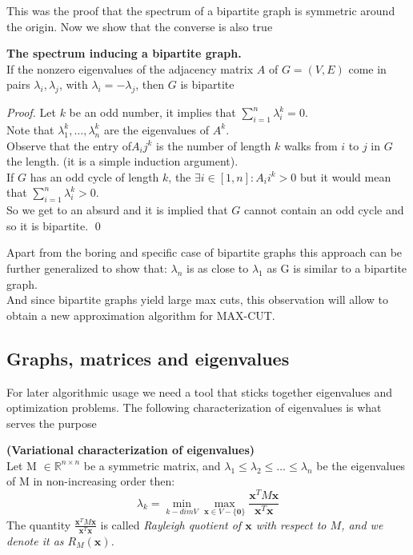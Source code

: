 This was the proof that the spectrum of a bipartite graph is symmetric around the origin. Now we show that the converse is also true
\begin{proposition}{\textbf{The spectrum inducing a bipartite graph.}} \\
If the nonzero eigenvalues of the adjacency matrix $ A $ of $ G=(V,E) $ come in pairs $ \lambda_i, \lambda_j $, with $ \lambda_i = -\lambda_j $, then $ G $ is bipartite
\begin{proof}
Let $ k $ be an odd number, it implies that $ \sum_{i=1}^{n} \lambda_{i}^{k} = 0 $. \\
Note that $ \lambda_1^k, \dots, \lambda_n^k $ are the eigenvalues of $ A^k $. \\
Observe that the entry of$ A_ij^k $ is the number of length $ k $ walks from $ i $ to $ j $ in $ G $ the length. (it is a simple induction argument).\\
If $ G $ has an odd cycle of length $ k $, the $ \exists i \in [1,n] : A_ii^k > 0 $ but it would mean that $ \sum_{i=1}^{n} \lambda_{i}^{k} > 0 $.\\
So we get to an absurd and it is implied that $ G $ cannot contain an odd cycle and so it is bipartite.
\qed
\end{proof}
\end{proposition}	

Apart from the boring and specific case of bipartite graphs this approach can be further generalized to show that:
$ \lambda_n $ is as close to $ \lambda_1 $ as G is similar to a bipartite graph. \\
And since bipartite graphs yield large max cuts, this observation will allow to obtain a new approximation algorithm for MAX-CUT.

\subsection{Graphs, matrices and eigenvalues}
For later algorithmic usage we need a tool that sticks together eigenvalues and optimization problems. The following characterization of eigenvalues is what serves the purpose

\begin{theorem}{\textbf{(Variational characterization of eigenvalues)}}
	\\
	Let M $\in\mathbb{R}^{n \times n}$ be a symmetric matrix, and $\lambda_1 \leq \lambda_2 \leq \dots \leq \lambda_n$ be the eigenvalues of M in non-increasing order then:
	\[
	\lambda_{k} = \min_{k - dim V} \max_{\textbf{x} \in V - \{\textbf{0}\}} \frac{\textbf{x}^T M \textbf{x}}{\textbf{x}^T \textbf{x}}
	\]
	The quantity $ \frac{\textbf{x}^T M \textbf{x}}{\textbf{x}^T \textbf{x}} $ is called \em{Rayleigh quotient} of $ \mathbf{x} $ with respect to $ M $, and we denote it as $ R_M(\mathbf{x}) $.
\end{theorem}

